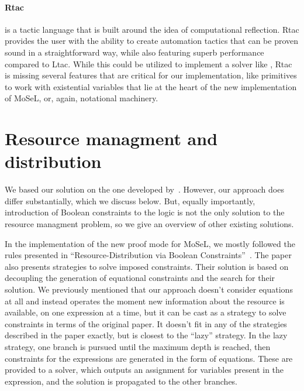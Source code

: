 \paragraph{Rtac~\cite{malechaExtensibleEfficientAutomation2016}} is a tactic language that is built around the idea of computational reflection.
  Rtac provides the user with the ability to create automation tactics that can be proven sound in a straightforward way, while also featuring superb performance compared to Ltac.
  While this could be utilized to implement a solver like , Rtac is missing several features that are critical for our implementation, like primitives to work with existential variables that lie at the heart of the new implementation of MoSeL, or, again, notational machinery.

\section{Resource managment and distribution}
\label{sec:reso-managm-distr}
We based our solution on the one developed by~\citet{harlandResourceDistributionBooleanConstraints2003}.
However, our approach does differ substantially, which we discuss below.
But, equally importantly, introduction of Boolean constraints to the logic is not the only solution to the resource managment problem, so we give an overview of other existing solutions.

In the implementation of the new proof mode for MoSeL, we mostly followed the rules presented in ``Resource-Distribution via Boolean Constraints''~\cite{harlandResourceDistributionBooleanConstraints2003}.
The paper also presents strategies to solve imposed constraints.
Their solution is based on decoupling the generation of equational constraints and the search for their solution.
We previously mentioned that our approach doesn't consider equations at all and instead operates the moment new information about the resource is available, on one expression at a time, but it can be cast as a strategy to solve constraints in terms of the original paper.
It doesn't fit in any of the strategies described in the paper exactly, but is closest to the ``lazy'' strategy.
In the lazy strategy, one branch is pursued until the maximum depth is reached, then constraints for the expressions are generated in the form of equations.
These are provided to a solver, which outputs an assignment for variables present in the expression, and the solution is propagated to the other branches.

